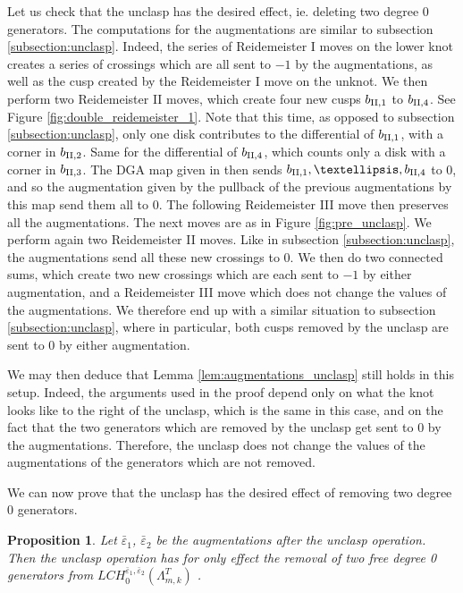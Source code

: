 \documentclass[11pt]{amsart}
\theoremstyle{plain}
\newtheorem{Prop}[defn]{Proposition}
\theoremstyle{remark}
\numberwithin{equation}{section}
\begin{document}
Let us check that the unclasp has the desired effect, ie. deleting two degree 0 generators. The computations for the augmentations are similar to subsection \ref{subsection:unclasp}. Indeed, the series of Reidemeister I moves on the lower knot creates a series of crossings which are all sent to $-1$ by the augmentations, as well as the cusp created by the Reidemeister I move on the unknot. We then perform two Reidemeister II moves, which create four new cusps $b_{\rm II,1}$ to $b_{\rm II,4}$. See Figure \ref{fig:double_reidemeister_1}. Note that this time, as opposed to subsection \ref{subsection:unclasp}, only one disk contributes to the differential of $b_{\rm II,1}$, with a corner in $b_{\rm II,2}$. Same for the differential of $b_{\rm II,4}$, which counts only a disk with a corner in $b_{\rm II,3}$. The DGA map given in \cite[section 6.3.3.]{EKK} then sends $b_{\rm II,1},…,b_{\rm II,4}$ to 0, and so the augmentation given by the pullback of the previous augmentations by this map send them all to 0. The following Reidemeister III move then preserves all the augmentations. The next moves are as in Figure \ref{fig:pre_unclasp}. We perform again two Reidemeister II moves. Like in subsection \ref{subsection:unclasp}, the augmentations send all these new crossings to 0. We then do two connected sums, which create two new crossings which are each sent to $-1$ by either augmentation, and a Reidemeister III move which does not change the values of the augmentations. We therefore end up with a similar situation to subsection \ref{subsection:unclasp}, where in particular, both cusps removed by the unclasp are sent to 0 by either augmentation. 

We may then deduce that Lemma \ref{lem:augmentations_unclasp} still holds in this setup. Indeed, the arguments used in the proof depend only on what the knot looks like to the right of the unclasp, which is the same in this case, and on the fact that the two generators which are removed by the unclasp get sent to 0 by the augmentations. Therefore, the unclasp does not change the values of the augmentations of the generators which are not removed.

We can now prove that the unclasp has the desired effect of removing two degree 0 generators. 

\begin{Prop}\label{prop:unclasp_2}
Let $\bar\varepsilon_1$, $\bar\varepsilon_2$ be the augmentations after the unclasp operation. Then the unclasp operation has for only effect the removal of two free degree 0 generators from $LCH^{\bar\varepsilon_1, \bar\varepsilon_2}_{0}(\Lambda^T_{m,k})$ . \end{Prop}
\end{document}
